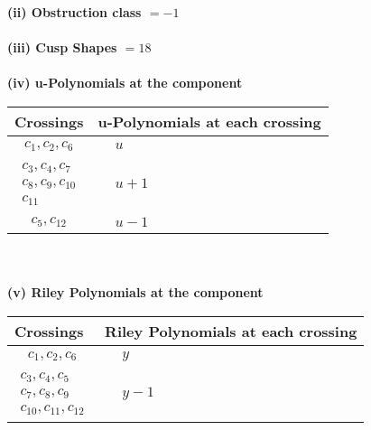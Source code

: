 \documentclass[1p]{elsarticle_modified}
\theoremstyle{definition}
\begin{document}
\flushleft \textbf{(ii) Obstruction class $= -1$}\\~\\
\flushleft \textbf{(iii) Cusp Shapes $= 18$}\\~\\
\newpage\renewcommand{\arraystretch}{1}
\flushleft \textbf{(iv) u-Polynomials at the component}\newline \\
\begin{tabular}{m{50pt}|m{274pt}}
Crossings & \hspace{64pt}u-Polynomials at each crossing \\
\hline $$\begin{aligned}c_{1},c_{2},c_{6}\end{aligned}$$&$\begin{aligned}
&u
\end{aligned}$\\
\hline $$\begin{aligned}c_{3},c_{4},c_{7}\\c_{8},c_{9},c_{10}\\c_{11}\end{aligned}$$&$\begin{aligned}
&u+1
\end{aligned}$\\
\hline $$\begin{aligned}c_{5},c_{12}\end{aligned}$$&$\begin{aligned}
&u-1
\end{aligned}$\\
\hline
\end{tabular}\\~\\
\newpage\renewcommand{\arraystretch}{1}
\flushleft \textbf{(v) Riley Polynomials at the component}\newline \\
\begin{tabular}{m{50pt}|m{274pt}}
Crossings & \hspace{64pt}Riley Polynomials at each crossing \\
\hline $$\begin{aligned}c_{1},c_{2},c_{6}\end{aligned}$$&$\begin{aligned}
&y
\end{aligned}$\\
\hline $$\begin{aligned}c_{3},c_{4},c_{5}\\c_{7},c_{8},c_{9}\\c_{10},c_{11},c_{12}\end{aligned}$$&$\begin{aligned}
&y-1
\end{aligned}$\\
\hline
\end{tabular}\\~\\
\end{document}
